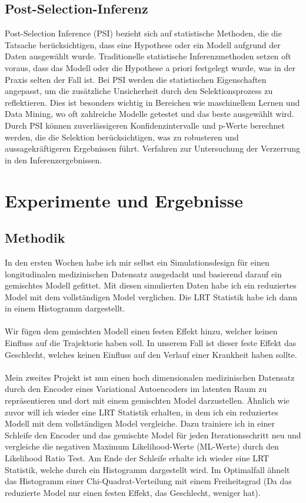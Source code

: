 \documentclass[%
thesis=student,%
coverpage=false,%
titlepage=false,%
headmarks=true, %
german,%
font=libertine, %
math=newpxtx, %
BCOR=5mm,%
coverBCOR=11mm%
]{tumbook}
\theoremstyle{break}
\begin{document}
\subsection{Post-Selection-Inferenz}
Post-Selection Inference (PSI) bezieht sich auf statistische Methoden, die die Tatsache berücksichtigen, dass eine Hypothese oder ein Modell aufgrund der Daten ausgewählt wurde. Traditionelle statistische Inferenzmethoden setzen oft voraus, dass das Modell oder die Hypothese a priori festgelegt wurde, was in der Praxis selten der Fall ist. Bei PSI werden die statistischen Eigenschaften angepasst, um die zusätzliche Unsicherheit durch den Selektionsprozess zu reflektieren. Dies ist besonders wichtig in Bereichen wie maschinellem Lernen und Data Mining, wo oft zahlreiche Modelle getestet und das beste ausgewählt wird. Durch PSI können zuverlässigeren Konfidenzintervalle und p-Werte berechnet werden, die die Selektion berücksichtigen, was zu robusteren und aussagekräftigeren Ergebnissen führt.
Verfahren zur Untersuchung der Verzerrung in den Inferenzergebnissen.

\section{Experimente und Ergebnisse}

\subsection{Methodik}
In den ersten Wochen habe ich mir selbst ein Simulationsdesign für einen longitudinalen medizinischen Datensatz ausgedacht und basierend darauf ein gemischtes Modell gefittet. Mit diesen simulierten Daten habe ich ein reduziertes Model mit dem vollständigen Model verglichen. Die LRT Statistik habe ich dann in einem Histogramm dargestellt.\\
\\
Wir fügen dem gemischten Modell einen festen Effekt hinzu, welcher keinen Einfluss auf die Trajektorie haben soll. In unserem Fall ist dieser feste Effekt das Geschlecht, welches keinen Einfluss auf den Verlauf einer Krankheit haben sollte.\\
\\
Mein zweites Projekt ist nun einen hoch dimensionalen medizinischen Datensatz durch den Encoder eines Variational Autoencoders im latenten Raum zu repräsentieren und dort mit einem gemischten Model darzustellen. Ähnlich wie zuvor will ich wieder eine LRT Statistik erhalten, in dem ich ein reduziertes Modell mit dem vollständigen Model vergleiche. Dazu trainiere ich in einer Schleife den Encoder und das gemischte Model für jeden Iterationsschritt neu und vergleiche die negativen Maximum Likelihood-Werte (ML-Werte) durch den Likelihood Ratio Test. Am Ende der Schleife erhalte ich wieder eine LRT Statistik, welche durch ein Histogramm dargestellt wird. Im Optimalfall ähnelt das Histogramm einer Chi-Quadrat-Verteilung mit einem Freiheitsgrad (Da das reduzierte Model nur einen festen Effekt, das Geschlecht, weniger hat).\\
\end{document}

